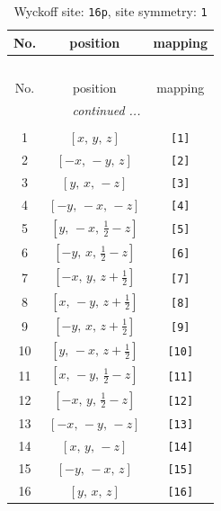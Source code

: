 \documentclass[fleqn,8pt]{jsarticle}
\begin{document}
\begin{longtable}{ccc}
\caption{Wyckoff site: {\tt 16p}, site symmetry: {\tt 1}}
 \\
 \hline \hline
No. & position & mapping \\ \hline \endfirsthead

\multicolumn{2}{l}{\tablename\ \thetable{}} \\
 \hline \hline
No. & position & mapping \\ \hline \endhead

 \hline \hline
\multicolumn{2}{r}{\footnotesize\it continued ...} \\ \endfoot

 \hline \hline
\multicolumn{2}{r}{} \\ \endlastfoot

1 & $\left[ x,\, y,\, z \right]$ & {\tt [1]} \\ \hline
2 & $\left[ - x,\, - y,\, z \right]$ & {\tt [2]} \\ \hline
3 & $\left[ y,\, x,\, - z \right]$ & {\tt [3]} \\ \hline
4 & $\left[ - y,\, - x,\, - z \right]$ & {\tt [4]} \\ \hline
5 & $\left[ y,\, - x,\, \frac{1}{2} - z \right]$ & {\tt [5]} \\ \hline
6 & $\left[ - y,\, x,\, \frac{1}{2} - z \right]$ & {\tt [6]} \\ \hline
7 & $\left[ - x,\, y,\, z + \frac{1}{2} \right]$ & {\tt [7]} \\ \hline
8 & $\left[ x,\, - y,\, z + \frac{1}{2} \right]$ & {\tt [8]} \\ \hline
9 & $\left[ - y,\, x,\, z + \frac{1}{2} \right]$ & {\tt [9]} \\ \hline
10 & $\left[ y,\, - x,\, z + \frac{1}{2} \right]$ & {\tt [10]} \\ \hline
11 & $\left[ x,\, - y,\, \frac{1}{2} - z \right]$ & {\tt [11]} \\ \hline
12 & $\left[ - x,\, y,\, \frac{1}{2} - z \right]$ & {\tt [12]} \\ \hline
13 & $\left[ - x,\, - y,\, - z \right]$ & {\tt [13]} \\ \hline
14 & $\left[ x,\, y,\, - z \right]$ & {\tt [14]} \\ \hline
15 & $\left[ - y,\, - x,\, z \right]$ & {\tt [15]} \\ \hline
16 & $\left[ y,\, x,\, z \right]$ & {\tt [16]} \\
\end{longtable}
\end{document}
